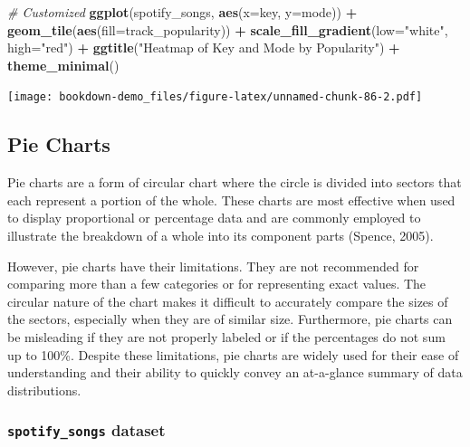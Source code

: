 \documentclass[
  b5paper]{book}
\newenvironment{Shaded}{\begin{snugshade}}{\end{snugshade}}
\newcommand{\AttributeTok}[1]{\textcolor[rgb]{0.13,0.29,0.53}{#1}}
\newcommand{\CommentTok}[1]{\textcolor[rgb]{0.56,0.35,0.01}{\textit{#1}}}
\newcommand{\FunctionTok}[1]{\textcolor[rgb]{0.13,0.29,0.53}{\textbf{#1}}}
\newcommand{\NormalTok}[1]{#1}
\newcommand{\SpecialCharTok}[1]{\textcolor[rgb]{0.81,0.36,0.00}{\textbf{#1}}}
\newcommand{\StringTok}[1]{\textcolor[rgb]{0.31,0.60,0.02}{#1}}
\begin{document}
\begin{Shaded}
\begin{Highlighting}[]
\CommentTok{\# Customized}
\FunctionTok{ggplot}\NormalTok{(spotify\_songs, }\FunctionTok{aes}\NormalTok{(}\AttributeTok{x=}\NormalTok{key, }\AttributeTok{y=}\NormalTok{mode)) }\SpecialCharTok{+} 
  \FunctionTok{geom\_tile}\NormalTok{(}\FunctionTok{aes}\NormalTok{(}\AttributeTok{fill=}\NormalTok{track\_popularity)) }\SpecialCharTok{+}
  \FunctionTok{scale\_fill\_gradient}\NormalTok{(}\AttributeTok{low=}\StringTok{"white"}\NormalTok{, }\AttributeTok{high=}\StringTok{"red"}\NormalTok{) }\SpecialCharTok{+}
  \FunctionTok{ggtitle}\NormalTok{(}\StringTok{"Heatmap of Key and Mode by Popularity"}\NormalTok{) }\SpecialCharTok{+}
  \FunctionTok{theme\_minimal}\NormalTok{()}
\end{Highlighting}
\end{Shaded}

\texttt{[image: bookdown-demo\_files/figure-latex/unnamed-chunk-86-2.pdf]}

\hypertarget{pie-charts}{%
\subsection*{Pie Charts}\label{pie-charts}}

Pie charts are a form of circular chart where the circle is divided into sectors that each represent a portion of the whole. These charts are most effective when used to display proportional or percentage data and are commonly employed to illustrate the breakdown of a whole into its component parts (Spence, 2005).

However, pie charts have their limitations. They are not recommended for comparing more than a few categories or for representing exact values. The circular nature of the chart makes it difficult to accurately compare the sizes of the sectors, especially when they are of similar size. Furthermore, pie charts can be misleading if they are not properly labeled or if the percentages do not sum up to 100\%. Despite these limitations, pie charts are widely used for their ease of understanding and their ability to quickly convey an at-a-glance summary of data distributions.

\hypertarget{spotify_songs-dataset-9}{%
\subsubsection*{\texorpdfstring{\texttt{spotify\_songs} dataset}{spotify\_songs dataset}}\label{spotify_songs-dataset-9}}
\end{document}
